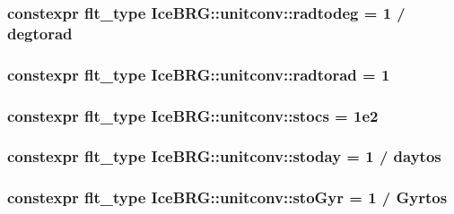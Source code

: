 \subsubsection[{radtodeg}]{\setlength{\rightskip}{0pt plus 5cm}constexpr {\bf flt\+\_\+type} Ice\+B\+R\+G\+::unitconv\+::radtodeg = 1 / {\bf degtorad}}\label{namespaceIceBRG_1_1unitconv_a4d3abf3e99716b322bf8ec50f6a753aa}
\hypertarget{namespaceIceBRG_1_1unitconv_a2fa9e19700589fb3cb2973a52efb0d4a}{}
\subsubsection[{radtorad}]{\setlength{\rightskip}{0pt plus 5cm}constexpr {\bf flt\+\_\+type} Ice\+B\+R\+G\+::unitconv\+::radtorad = 1}\label{namespaceIceBRG_1_1unitconv_a2fa9e19700589fb3cb2973a52efb0d4a}
\hypertarget{namespaceIceBRG_1_1unitconv_ae82a3ddfd08d31a4dd7e076aff873299}{}
\subsubsection[{stocs}]{\setlength{\rightskip}{0pt plus 5cm}constexpr {\bf flt\+\_\+type} Ice\+B\+R\+G\+::unitconv\+::stocs = 1e2}\label{namespaceIceBRG_1_1unitconv_ae82a3ddfd08d31a4dd7e076aff873299}
\hypertarget{namespaceIceBRG_1_1unitconv_abd1d9e471c12143842e27217abef5360}{}
\subsubsection[{stoday}]{\setlength{\rightskip}{0pt plus 5cm}constexpr {\bf flt\+\_\+type} Ice\+B\+R\+G\+::unitconv\+::stoday = 1 / {\bf daytos}}\label{namespaceIceBRG_1_1unitconv_abd1d9e471c12143842e27217abef5360}
\hypertarget{namespaceIceBRG_1_1unitconv_a25c7377a7f43fef4455b630cb734d1e7}{}
\subsubsection[{sto\+Gyr}]{\setlength{\rightskip}{0pt plus 5cm}constexpr {\bf flt\+\_\+type} Ice\+B\+R\+G\+::unitconv\+::sto\+Gyr = 1 / {\bf Gyrtos}}\label{namespaceIceBRG_1_1unitconv_a25c7377a7f43fef4455b630cb734d1e7}
\hypertarget{namespaceIceBRG_1_1unitconv_a6ad8f8ca37aa75dc5157627446570a2d}{}
